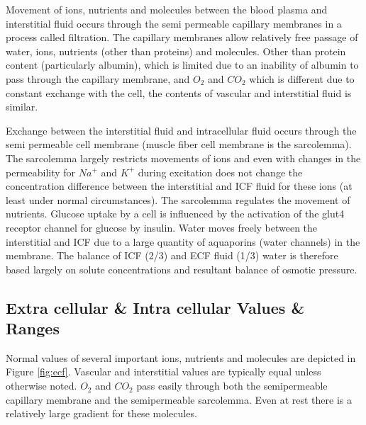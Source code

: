Movement of ions, nutrients and molecules between the blood plasma and interstitial fluid occurs through the semi permeable capillary membranes in a process called filtration. The capillary membranes allow relatively free passage of water, ions, nutrients (other than proteins) and molecules. Other than protein content (particularly albumin), which is limited due to an inability of albumin to pass through the capillary membrane, and $O_2$ and $CO_2$ which is different due to constant exchange with the cell, the contents of vascular and interstitial fluid is similar. 

Exchange between the interstitial fluid and intracellular fluid occurs through the semi permeable cell membrane (muscle fiber cell membrane is the sarcolemma). The sarcolemma largely restricts movements of ions and even with changes in the permeability for $Na^+$ and $K^+$ during excitation does not change the concentration difference between the interstitial and ICF fluid for these ions (at least under normal circumstances). The sarcolemma regulates the movement of nutrients.  Glucose uptake by a cell is influenced by the activation of the glut4 receptor channel for glucose by insulin. Water moves freely between the interstitial and ICF due to a large quantity of aquaporins (water channels) in the membrane. The balance of ICF (2/3) and ECF fluid (1/3) water is therefore based largely on solute concentrations and resultant balance of osmotic pressure.

\subsection{Extra cellular \& Intra cellular Values \& Ranges}

Normal values of several important ions, nutrients and molecules are depicted in Figure \ref{fig:ecf}. Vascular and interstitial values are typically equal unless otherwise noted. $O_2$ and $CO_2$ pass easily through both the semipermeable capillary membrane and the semipermeable sarcolemma. Even at rest there is a relatively large gradient for these molecules. 

